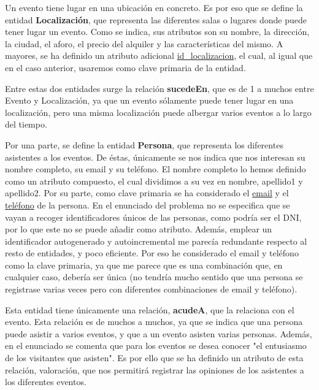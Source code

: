 \documentclass[a4paper,onecolumn]{article}
\begin{document}
\begin{sloppypar}
Un evento tiene lugar en una ubicación en concreto. Es por eso que se define la entidad \textbf{Localización}, que representa las diferentes
salas o lugares donde puede tener lugar un evento. Como se indica, sus atributos son su nombre, la dirección, la ciudad, el aforo,
el precio del alquiler y las características del mismo. A mayores, se ha definido un atributo adicional \underline{id\_localizacion},
el cual, al igual que en el caso anterior, usaremos como clave primaria de la entidad.

Entre estas dos entidades surge la relación \textbf{sucedeEn}, que es de 1 a muchos entre Evento y Localización, ya que un evento sólamente puede
tener lugar en una localización, pero una misma localización puede albergar varios eventos a lo largo del tiempo.

Por una parte, se define la entidad \textbf{Persona}, que representa los diferentes asistentes a los eventos. De éstas, únicamente se nos indica 
que nos interesan su nombre completo, su email y su teléfono. El nombre completo lo hemos definido como un atributo compuesto, el cual dividimos
a su vez en nombre, apellido1 y apellido2. Por su parte, como clave primaria se ha considerado el \underline{email} y el \underline{teléfono} de la 
persona. En el enunciado del problema no se especifica que se vayan a recoger identificadores únicos de las personas, como podría ser el DNI, por lo que
este no se puede añadir como atributo. Además, emplear un identificador autogenerado y autoincremental me parecía redundante respecto al resto de 
entidades, y poco eficiente. Por eso he considerado el email y teléfono como la clave primaria, ya que me parece que es una combinación que, en cualquier
caso, debería ser única (no tendría mucho sentido que una persona se registrase varias veces pero con diferentes combinaciones de email y teléfono).

Esta entidad tiene únicamente una relación, \textbf{acudeA}, que la relaciona con el evento. Esta relación es de muchos a muchos, ya que se indica que una persona
puede asistir a varios eventos, y que a un evento asisten varias personas. Además, en el enunciado se comenta que para los eventos se desea conocer
"el entusiasmo de los visitantes que asisten". Es por ello que se ha definido un atributo de esta relación, valoración, que nos permitirá registrar
las opiniones de los asistentes a los diferentes eventos.


\end{sloppypar}
\end{document}
